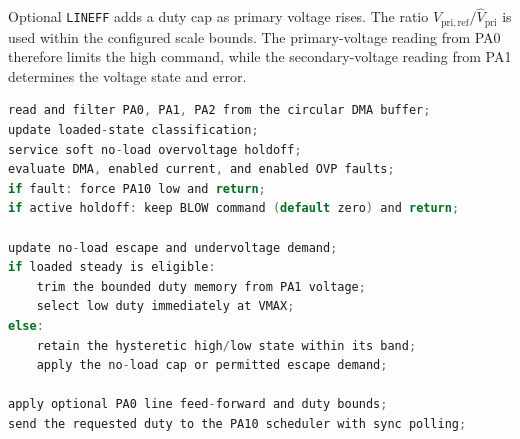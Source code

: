 Optional \texttt{LINEFF} adds a duty cap as primary voltage rises. The ratio \(V_{\mathrm{pri,ref}}/\widehat V_{\mathrm{pri}}\) is used within the configured scale bounds. The primary-voltage reading from PA0 therefore limits the high command, while the secondary-voltage reading from PA1 determines the voltage state and error.

\begin{minipage}{\linewidth}
\begin{lstlisting}[language=C,basicstyle=\ttfamily\small,caption={Baseline voltage-control sequence. Fault handling is described in Section~\ref{sec:ctrl-faults}.},label={lst:ctrl-pwr1920-summary}]
read and filter PA0, PA1, PA2 from the circular DMA buffer;
update loaded-state classification;
service soft no-load overvoltage holdoff;
evaluate DMA, enabled current, and enabled OVP faults;
if fault: force PA10 low and return;
if active holdoff: keep BLOW command (default zero) and return;

update no-load escape and undervoltage demand;
if loaded steady is eligible:
    trim the bounded duty memory from PA1 voltage;
    select low duty immediately at VMAX;
else:
    retain the hysteretic high/low state within its band;
    apply the no-load cap or permitted escape demand;

apply optional PA0 line feed-forward and duty bounds;
send the requested duty to the PA10 scheduler with sync polling;
\end{lstlisting}
\end{minipage}
